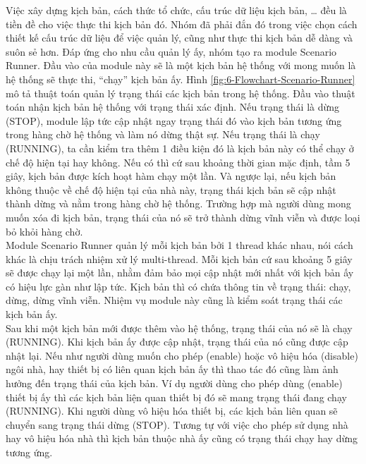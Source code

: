 \documentclass[12pt,a4paper,oneside]{extbook}
\begin{document}
\noindent
Việc xây dựng kịch bản, cách thức tổ chức, cấu trúc dữ liệu kịch bản, … đều là tiền đề cho việc thực thi kịch bản đó. Nhóm đã phải đắn đó trong việc chọn cách thiết kế cấu trúc dữ liệu để việc quản lý, cũng như thực thi kịch bản dễ dàng và suôn sẻ hơn. Đáp ứng cho nhu cầu quản lý ấy, nhóm tạo ra module Scenario Runner. Đầu vào của module này sẽ là một kịch bản hệ thống với mong muốn là hệ thống sẽ thực thi, “chạy” kịch bản ấy. Hình \ref{fig:6-Flowchart-Scenario-Runner} mô tả thuật toán quản lý trạng thái các kịch bản trong hệ thống. Đầu vào thuật toán nhận kịch bản hệ thống với trạng thái xác định. Nếu trạng thái là dừng (STOP), module lập tức cập nhật ngay trạng thái đó vào kịch bản tương ứng trong hàng chờ hệ thống và làm nó dừng thật sự. Nếu trạng thái là chạy (RUNNING), ta cần kiểm tra thêm 1 điều kiện đó là kịch bản này có thể chạy ở chế độ hiện tại hay không. Nếu có thì cứ sau khoảng thời gian mặc định, tầm 5 giây, kịch bản được kích hoạt hàm chạy một lần. Và ngược lại, nếu kịch bản không thuộc về chế độ hiện tại của nhà này, trạng thái kịch bản sẽ cập nhật thành dừng và nằm trong hàng chờ hệ thống. Trường hợp mà người dùng mong muốn xóa đi kịch bản, trạng thái của nó sẽ trở thành dừng vĩnh viễn và được loại bỏ khỏi hàng chờ.\\

\noindent
Module Scenario Runner quản lý mỗi kịch bản bởi 1 thread khác nhau, nói cách khác là chịu trách nhiệm xử lý multi-thread. Mỗi kịch bản cứ sau khoảng 5 giây sẽ được chạy lại một lần, nhằm đảm bảo mọi cập nhật mới nhất với kịch bản ấy có hiệu lực gàn như lập tức. Kịch bản thì có chứa thông tin về trạng thái: chạy, dừng, dừng vĩnh viễn. Nhiệm vụ module này cũng là kiểm soát trạng thái các kịch bản ấy.\\

\noindent
Sau khi một kịch bản mới được thêm vào hệ thống, trạng thái của nó sẽ là chạy (RUNNING). Khi kịch bản ấy được cập nhật, trạng thái của nó cũng được cập nhật lại. Nếu như người dùng muốn cho phép (enable) hoặc vô hiệu hóa (disable) ngôi nhà, hay thiết bị có liên quan kịch bản ấy thì thao tác đó cũng làm ảnh hưởng đến trạng thái của kịch bản. Ví dụ người dùng cho phép dùng (enable) thiết bị ấy thì các kịch bản liện quan thiết bị đó sẽ mang trạng thái đang chạy (RUNNING). Khi người dùng vô hiệu hóa thiết bị, các kịch bản liên quan sẽ chuyển sang trạng thái dừng (STOP). Tương tự với việc cho phép sử dụng nhà hay vô hiệu hóa nhà thì kịch bản thuộc nhà ấy cũng có trạng thái chạy hay dừng tương ứng.\\
\end{document}
